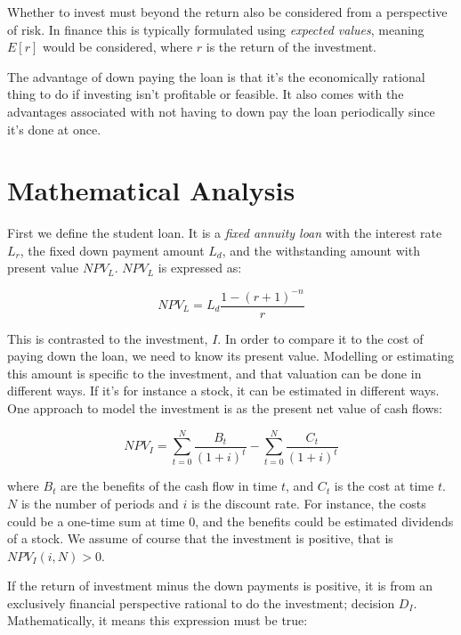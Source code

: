 \documentclass[a4paper]{article}
\begin{document}
Whether to invest must beyond the return also be considered from a perspective
of risk. In finance this is typically formulated using \emph{expected values},
meaning $E[r]$ would be considered, where $r$ is the return of the investment.

The advantage of down paying the loan is that it's the economically rational
thing to do if investing isn't profitable or feasible. It also comes with the
advantages associated with not having to down pay the loan periodically since
it's done at once.

\section{Mathematical Analysis}

First we define the student loan. It is a \emph{fixed annuity loan} with the
interest rate $L_r$, the fixed down payment amount $L_d$, and the withstanding
amount with present value $NPV_L$. $NPV_L$ is expressed as:


\begin{equation}
\label{eq:NPV_L}
NPV_L=L_d \frac{1 - (r + 1)^{-n}}{r}
\end{equation}

This is contrasted to the investment, $I$. In order to compare it to the cost
of paying down the loan, we need to know its present value. Modelling or
estimating this amount is specific to the investment, and that valuation can be
done in different ways. If it's for instance a stock, it can be estimated in
different ways. One approach to model the investment is as the present net
value of cash flows:


\begin{equation}
\label{eq:NPV_I}
NPV_I = {\sum_{t=0}^{N} \frac{B_t}{(1 + i)^t} -
         \sum_{t=0}^{N} \frac{C_t}{(1 + i)^t}}
\end{equation}

where $B_t$ are the benefits of the cash flow in time $t$, and $C_t$ is the cost
at time $t$. $N$ is the number of periods and $i$ is the discount rate. For
instance, the costs could be a one-time sum at time $0$, and the benefits could
be estimated dividends of a stock. We assume of course that the investment is
positive, that is $NPV_I(i, N) > 0$.

If the return of investment minus the down payments is positive, it is from an
exclusively financial perspective rational to do the investment; decision $D_I$.
Mathematically, it means this expression must be true:
\end{document}
